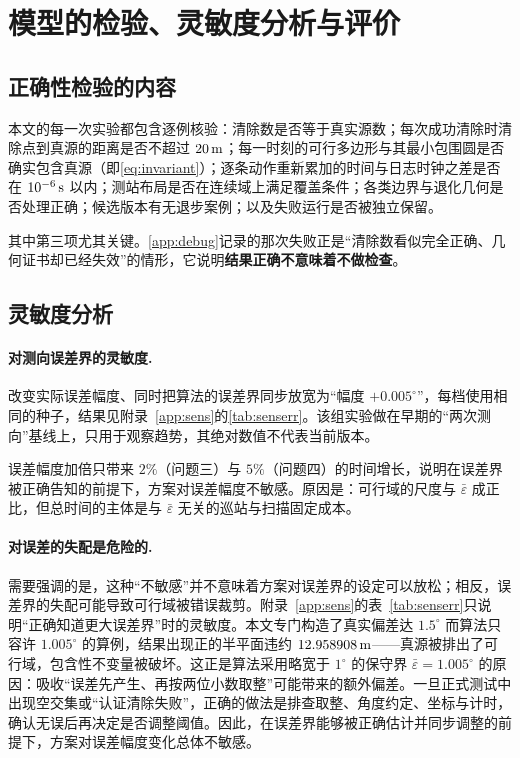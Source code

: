 \section{模型的检验、灵敏度分析与评价}\label{sec:eval}

\subsection{正确性检验的内容}

本文的每一次实验都包含逐例核验：清除数是否等于真实源数；每次成功清除时清除点到真源的距离是否不超过 $20\,\mathrm{m}$；每一时刻的可行多边形与其最小包围圆是否确实包含真源（即\cref{eq:invariant}）；逐条动作重新累加的时间与日志时钟之差是否在 $10^{-6}\,\mathrm{s}$ 以内；测站布局是否在连续域上满足覆盖条件；各类边界与退化几何是否处理正确；候选版本有无退步案例；以及失败运行是否被独立保留。

其中第三项尤其关键。\cref{app:debug}记录的那次失败正是“清除数看似完全正确、几何证书却已经失效”的情形，它说明\textbf{结果正确不意味着不做检查}。

\subsection{灵敏度分析}

\paragraph{对测向误差界的灵敏度.}

改变实际误差幅度、同时把算法的误差界同步放宽为“幅度 $+0.005^\circ$”，每档使用相同的种子，结果见附录~\ref{app:sens}的\cref{tab:senserr}。该组实验做在早期的“两次测向”基线上，只用于观察趋势，其绝对数值不代表当前版本。

误差幅度加倍只带来 $2\%$（问题三）与 $5\%$（问题四）的时间增长，说明在误差界被正确告知的前提下，方案对误差幅度不敏感。原因是：可行域的尺度与 $\bar\varepsilon$ 成正比，但总时间的主体是与 $\bar\varepsilon$ 无关的巡站与扫描固定成本。

\paragraph{对误差的失配是危险的.} 需要强调的是，这种“不敏感”并不意味着方案对误差界的设定可以放松；相反，误差界的失配可能导致可行域被错误裁剪。附录~\ref{app:sens}的表~\ref{tab:senserr}只说明“正确知道更大误差界”时的灵敏度。本文专门构造了真实偏差达 $1.5^\circ$ 而算法只容许 $1.005^\circ$ 的算例，结果出现正的半平面违约 $12.958908\,\mathrm{m}$——真源被排出了可行域，包含性不变量被破坏。这正是算法采用略宽于 $1^\circ$ 的保守界 $\bar\varepsilon=1.005^\circ$ 的原因：吸收“误差先产生、再按两位小数取整”可能带来的额外偏差。一旦正式测试中出现空交集或“认证清除失败”，正确的做法是排查取整、角度约定、坐标与计时，确认无误后再决定是否调整阈值。因此，在误差界能够被正确估计并同步调整的前提下，方案对误差幅度变化总体不敏感。

